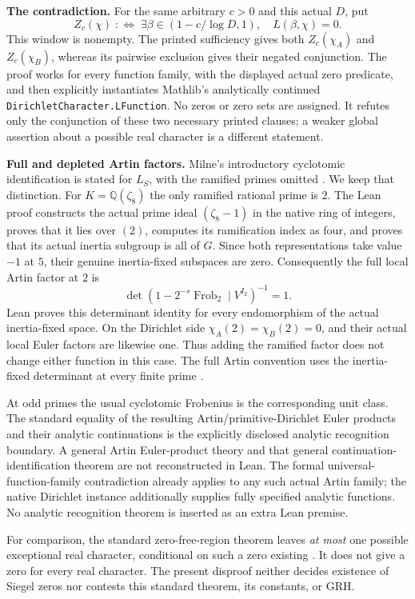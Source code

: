 \documentclass[10pt,a4paper]{article}
\begin{document}
\textbf{The contradiction.}
For the same arbitrary $c>0$ and this actual $D$, put
\[
 Z_c(\chi)\;:\Longleftrightarrow\;
 \exists\beta\in(1-c/\log D,1),\quad L(\beta,\chi)=0.
\]
This window is nonempty. The printed sufficiency gives both $Z_c(\chi_A)$ and
$Z_c(\chi_B)$, whereas its pairwise exclusion gives their negated conjunction.
The proof works for every function family, with the displayed actual
zero predicate, and then explicitly instantiates Mathlib's analytically
continued \texttt{DirichletCharacter.LFunction}. No zeros or zero sets are
assigned. It refutes only the conjunction of these two necessary printed
clauses; a weaker global assertion about a possible real character is a
different statement.

\newpage
\textbf{Full and depleted Artin factors.}
Milne's introductory cyclotomic identification is stated for $L_S$, with
the ramified primes omitted \cite[pp.~7--9]{milne}. We keep that distinction.
For $K=\mathbb Q(\zeta_8)$ the only ramified rational prime is $2$.
The Lean proof constructs the actual prime ideal $(\zeta_8-1)$ in the native
ring of integers, proves that it lies over $(2)$, computes its ramification
index as four, and proves that its actual inertia subgroup is all of $G$.
Since both representations take value $-1$ at $5$, their genuine
inertia-fixed subspaces are zero. Consequently the full local Artin factor
at $2$ is
\[
 \det(1-2^{-s}\operatorname{Frob}_2\mid V^{I_2})^{-1}=1.
\]
Lean proves this determinant identity for every endomorphism of the actual
inertia-fixed space. On the Dirichlet side $\chi_A(2)=\chi_B(2)=0$, and their
actual local Euler factors are likewise one. Thus adding the ramified factor
does not change either function in this case. The full Artin convention uses
the inertia-fixed determinant at every finite prime \cite[pp.~4--5]{block}.

At odd primes the usual cyclotomic Frobenius is the corresponding unit
class. The standard equality of the resulting Artin/primitive-Dirichlet
Euler products and their analytic continuations is the explicitly disclosed
analytic recognition boundary. A general Artin Euler-product theory and that
general continuation-identification theorem are not reconstructed in Lean.
The formal universal-function-family contradiction already applies to any
such actual Artin family; the native Dirichlet instance additionally supplies
fully specified analytic functions. No analytic recognition theorem is
inserted as an extra Lean premise.

For comparison, the standard zero-free-region theorem leaves \emph{at most}
one possible exceptional real character, conditional on such a zero existing
\cite[Theorem~12.3, p.~119; p.~123]{kouk}. It does not give a zero for every
real character. The present disproof neither decides existence of Siegel
zeros nor contests this standard theorem, its constants, or GRH.
\end{document}
